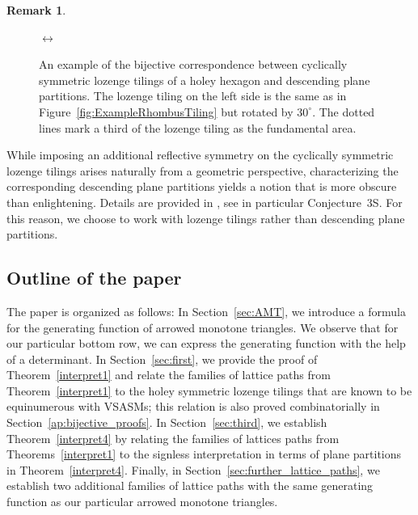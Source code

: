 \documentclass[12pt]{amsart}
\theoremstyle{definition}
\newtheorem{remark}[theorem]{Remark}
\numberwithin{equation}{section}
\begin{document}
\begin{remark}
\begin{figure}[htb]
		$\longleftrightarrow$
		\caption{An example of the bijective correspondence between cyclically symmetric lozenge tilings of a holey hexagon and descending plane partitions. The lozenge tiling on the left side is the same as in Figure~\ref{fig:ExampleRhombusTiling} but rotated by $30^\circ$. The dotted lines mark a third of the lozenge tiling as the fundamental area.}
		\label{fig:DPP}
	\end{figure}
	
	While imposing an additional reflective symmetry on the cyclically symmetric lozenge tilings arises naturally from a geometric perspective, 
	characterizing the corresponding descending plane partitions yields a notion that is more obscure than enlightening. Details are provided in 
	\cite{MilRobRum83}, see in particular Conjecture~3S. For this reason, we choose to work with lozenge tilings rather than descending plane partitions.


\end{remark}

\subsection*{Outline of the paper} 
The paper is organized as follows: In Section~\ref{sec:AMT}, we introduce a formula for the generating function of arrowed monotone triangles.
We observe that for our particular bottom row, we can express the generating function with the help of a determinant.   
In Section~\ref{sec:first}, we provide the proof of Theorem~\ref{interpret1} and relate the families of lattice paths from Theorem~\ref{interpret1} to the holey symmetric lozenge tilings that are known to be equinumerous with VSASMs; this relation is also proved combinatorially in Section~\ref{ap:bijective_proofs}. In Section~\ref{sec:third}, we establish Theorem~\ref{interpret4} by relating the families of lattices paths from Theorems~\ref{interpret1} to the signless interpretation in terms of plane partitions in Theorem~\ref{interpret4}. Finally, in Section~\ref{sec:further_lattice_paths}, we establish two additional families of lattice paths with the same generating function as our particular arrowed monotone triangles.
\end{document}
